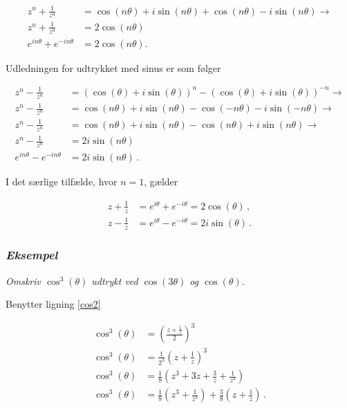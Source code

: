 \documentclass[a4paper, 12pt,titlepage]{article}
\begin{document}
\begin{align}
    z^n + \frac{1}{z^n} &=\cos(n\theta)+i \sin(n\theta)+\cos(n\theta)-i \sin(n\theta) \to \nonumber \\
    z^n + \frac{1}{z^n} &= 2\cos(n\theta)\nonumber\\
    e^{i n \theta} + e^{-i n \theta} &= 2\cos(n\theta).
\end{align}

Udledningen for udtrykket med sinus er som følger

\begin{align}
    z^n - \frac{1}{z^n} &=(\cos(\theta)+i \sin(\theta))^n-(\cos(\theta)+i \sin(\theta))^{-n} \to \nonumber\\
    z^n - \frac{1}{z^n} &=\cos(n\theta)+i \sin(n\theta)-\cos(-n\theta)-i \sin(-n\theta) \to \nonumber\\
    z^n - \frac{1}{z^n} &=\cos(n\theta)+i \sin(n\theta)-\cos(n\theta)+i \sin(n\theta) \to \nonumber\\
    z^n - \frac{1}{z^n} &= 2i \sin(n\theta) \nonumber\\
    e^{i n \theta} - e^{-i n \theta} &= 2i \sin(n\theta)\,. 
\end{align}

I det særlige tilfælde, hvor \(n=1\), gælder

\begin{align}
    z + \frac{1}{z} &= e^{i\theta} + e^{-i\theta} = 2 \cos(\theta) \,, \label{cos2}\\
    z - \frac{1}{z} &= e^{i\theta} - e^{-i\theta} = 2 i \sin(\theta) \,. 
\end{align}

\subsubsection*{\emph{Eksempel}}
\label{sec:org6fdc627}
\emph{Omskriv \(\cos^3(\theta)\) udtrykt ved \(\cos(3 \theta)\) og \(\cos(\theta)\).}

Benytter ligning \eqref{cos2}

\begin{align*}
    \cos^3(\theta) &= \left(\frac{z+\frac{1}{z}}{2}\right)^3 \\
    \cos^3(\theta) &= \frac{1}{2^3} \left(z+\frac{1}{z}\right)^3 \\
    \cos^3(\theta) &= \frac{1}{8} \left(z^3 + 3z + \frac{3}{z}+\frac{1}{z^3}\right) \\
    \cos^3(\theta) &= \frac{1}{8} \left(z^3 + \frac{1}{z^3}\right) +\frac{3}{8} \left(z + \frac{1}{z}\right)\,.
\end{align*}
\end{document}
